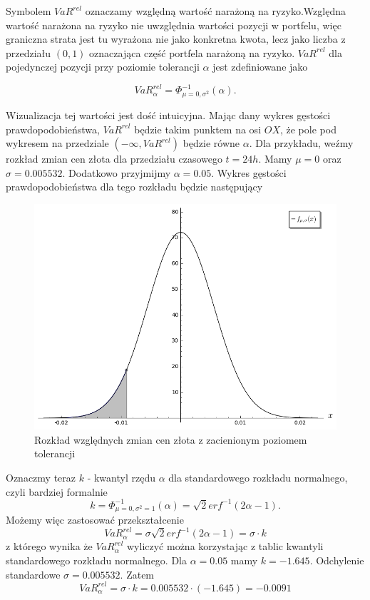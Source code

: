 \documentclass[11pt,titlepage]{article}
\numberwithin{equation}{section}
\begin{document}
Symbolem $VaR^{rel}$ oznaczamy względną wartość narażoną na ryzyko.Względna wartość narażona na ryzyko nie uwzględnia wartości pozycji w portfelu, więc graniczna strata jest tu wyrażona nie jako konkretna kwota, lecz jako liczba z przedziału $(0,1)$ oznaczająca część portfela narażoną na ryzyko. $VaR^{rel}$ dla pojedynczej pozycji przy poziomie tolerancji $\alpha$ jest zdefiniowane jako

$$VaR_{\alpha}^{rel}   =\Phi_{\mu=0,\sigma^{2}}^{-1}(\alpha).$$

Wizualizacja tej wartości jest dość intuicyjna. Mając dany wykres gęstości prawdopodobieństwa, $VaR^{rel}$ będzie takim punktem na osi $OX$, że pole pod wykresem na przedziale $(-\infty,VaR^{rel})$  będzie równe $\alpha$. Dla przykładu, weźmy rozkład zmian cen złota dla przedziału czasowego $t=24h$. Mamy $\mu=0$ oraz $\sigma=0.005532$. Dodatkowo przyjmijmy $\alpha=0.05$. Wykres gęstości prawdopodobieństwa dla tego rozkładu będzie następujący

\begin{figure}[H]
\begin{center}
\includegraphics[scale=0.5]{chart1.png}
\end{center}
\caption{Rozkład względnych zmian cen złota z zacienionym poziomem tolerancji} \label{czynnosci_GD}
\end{figure} 


Oznaczmy teraz $k$ - kwantyl rzędu $\alpha$ dla standardowego rozkładu normalnego, czyli bardziej formalnie 
$$k=\Phi_{\mu=0,\sigma^{2}=1}^{-1}(\alpha)=\sqrt{2} erf^{-1}(2\alpha-1).$$
Możemy więc zastosować przekształcenie
$$VaR_{\alpha}^{rel}   =\sigma \sqrt{2} erf^{-1}(2\alpha-1)=\sigma \cdot k$$
z którego wynika że $VaR_{\alpha}^{rel}$ wyliczyć można korzystając z tablic kwantyli standardowego rozkładu normalnego. Dla $\alpha=0.05$ mamy $k=-1.645$. Odchylenie standardowe $\sigma=0.005532$. Zatem
$$VaR_{\alpha}^{rel}=\sigma \cdot k= 0.005532 \cdot (-1.645)=-0.0091$$
\end{document}
